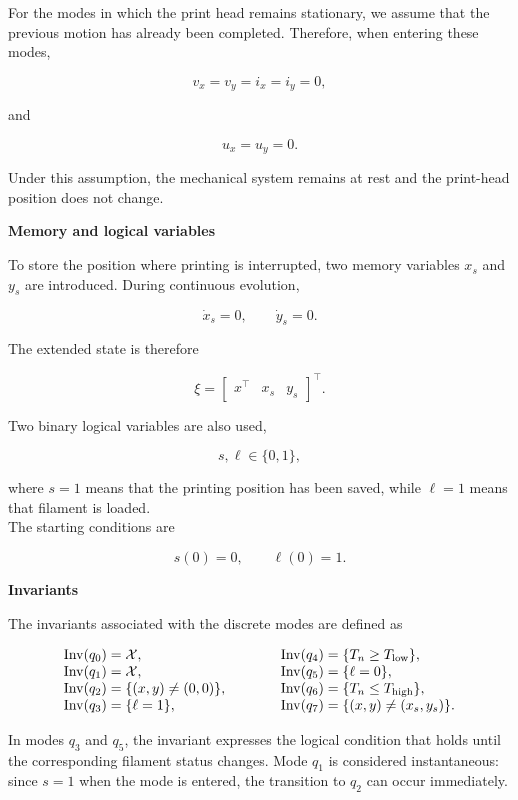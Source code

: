 \documentclass[11pt,a4paper]{article}
\begin{document}
For the modes in which the print head remains stationary, we assume that the previous motion has already been completed. Therefore, when entering these modes,

\[
v_x=v_y=i_x=i_y=0,
\]

and

\[
u_x=u_y=0.
\]

Under this assumption, the mechanical system remains at rest and the print-head position does not change.

\medskip
\noindent\textbf{Memory and logical variables}

To store the position where printing is interrupted, two memory variables \(x_s\) and \(y_s\)
are introduced. During continuous evolution,

\[
\dot{x}_s=0,
\qquad
\dot{y}_s=0.
\]

The extended state is therefore

\[
\xi =
\begin{bmatrix}
x^{\top} & x_s & y_s
\end{bmatrix}^{\top}.
\]

Two binary logical variables are also used,

\[
s,\ell\in\{0,1\},
\]

where \(s=1\) means that the printing position has been saved, while
\(\ell=1\) means that filament is loaded.\\
The starting conditions are

\[
s(0)=0,
\qquad
\ell(0)=1.
\]


\medskip
\noindent\textbf{Invariants}

The invariants associated with the discrete modes are defined as

\[
\begin{array}{r@{\;}c@{\;}l@{\qquad\qquad}r@{\;}c@{\;}l}
\operatorname{Inv}(q_0) &=& \mathcal{X}, &
\operatorname{Inv}(q_4) &=& \{T_n \geq T_{\mathrm{low}}\},\\
\operatorname{Inv}(q_1) &=& \mathcal{X}, &
\operatorname{Inv}(q_5) &=& \{\ell = 0\},\\
\operatorname{Inv}(q_2) &=& \{(x,y)\neq(0,0)\}, &
\operatorname{Inv}(q_6) &=& \{T_n \leq T_{\mathrm{high}}\},\\
\operatorname{Inv}(q_3) &=& \{\ell = 1\}, &
\operatorname{Inv}(q_7) &=& \{(x,y)\neq(x_s,y_s)\}.
\end{array}
\]

In modes \(q_3\) and \(q_5\), the invariant expresses the logical condition that holds until
the corresponding filament status changes. Mode \(q_1\) is considered instantaneous: since \(s=1\) when the
mode is entered, the transition to \(q_2\) can occur immediately.
\end{document}
